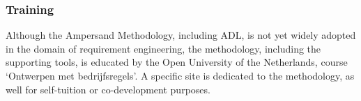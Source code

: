 \subsubsection{Training}
Although the Ampersand Methodology, including ADL, is not yet widely adopted in the domain of requirement engineering, the methodology, including the supporting tools, is educated by the Open University of the Netherlands, course `Ontwerpen met bedrijfsregels'. A specific site is dedicated to the methodology, as well for self-tuition or co-development purposes.

\noindent



